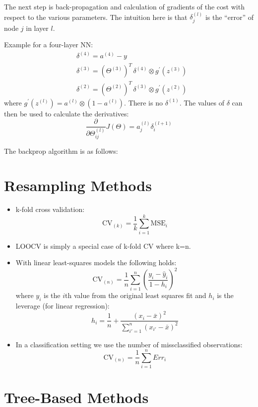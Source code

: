 \documentclass[12pt]{article}
\begin{document}
The next step is back-propagation and calculation of gradients of the cost with respect to the various parameters. The intuition here is that $\delta^{(l)}_j$ is the ``error'' of node $j$ in layer $l$.

Example for a four-layer NN:
\begin{align*}
&\delta^{(4)} = a^{(4)} - y \\
&\delta^{(3)} = (\Theta^{(3)})^T \, \delta^{(4)} \otimes g^{\prime} (z^{(3)})	\\
&\delta^{(2)} = (\Theta^{(2)})^T \, \delta^{(3)} \otimes g^{\prime} (z^{(2)})	
\end{align*}
where $g^{\prime}(z^{(l)}) = a^{(l)} \otimes (1 - a^{(l)})$. There is no $\delta^{(1)}$. The values of $\delta$ can then be used to calculate the derivatives:
\[
\frac{\partial}{\partial \Theta_{ij}^{(l)}}J(\Theta) =
a_j^{(l)}\delta_{i}^{(l+1)}
\]

The backprop algorithm is as follows:


\newpage{}

\section{Resampling Methods}
\begin{itemize}
\item k-fold cross validation: 
\[
\text{CV}_{(k)} =
\frac{1}{k} \sum^k_{i=1}\text{MSE}_i
\]
\item LOOCV is simply a special case of k-fold CV where k=n.
\item With linear least-squares models the following holds:
\[
\text{CV}_{(n)} = \frac{1}{n}\sum^n_{i=1}
\left( \frac{y_i - \hat y_i}{1 - h_i} \right)^2
\]
where $y_i$ is the $i$th value from the original least squares fit and $h_i$ is the leverage (for linear regression):
\[
h_i = \frac{1}{n} + \frac{(x_i - \bar x)^2}
{
\sum^n_{i'=1}(x_{i'}-\bar x)^2 
}
\]
\item In a classification setting we use the number of missclassified observations:
\[
\text{CV}_{(n)}=\frac{1}{n}
\sum^n_{i=1}Err_i
\]

\end{itemize}


\section{Tree-Based Methods}
\end{document}

